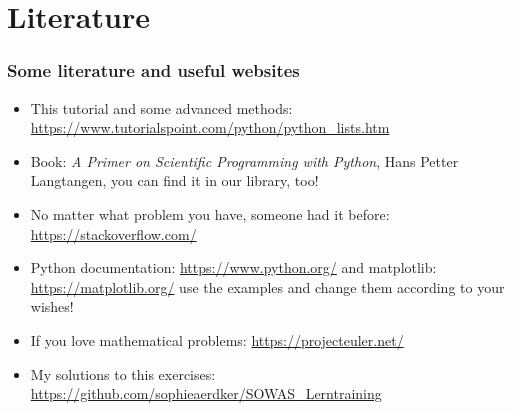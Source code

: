 \documentclass{beamer}
\begin{document}
\section{Literature}
\begin{frame}
\frametitle{Some literature and useful websites}
	\begin{itemize}
		\item This tutorial and some advanced methods: \url{https://www.tutorialspoint.com/python/python_lists.htm}
		\item Book: \textit{A Primer on Scientific Programming with Python}, Hans Petter Langtangen, you can find it in our library, too!
		\item No matter what problem you have, someone had it before: \url{https://stackoverflow.com/}
		\item Python documentation: \url{https://www.python.org/} and matplotlib: \url{https://matplotlib.org/} use the examples and change them according to your wishes!
		\item If you love mathematical problems: \url{https://projecteuler.net/}
		\item My solutions to this exercises: \url{https://github.com/sophieaerdker/SOWAS_Lerntraining}
	\end{itemize}
\end{frame}
\end{document}
